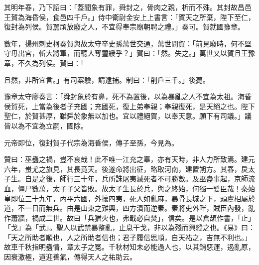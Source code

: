 \begin{pinyinscope}
其明年春，乃下詔曰：「蓋聞象有罪，舜封之，骨肉之親，析而不殊。其封故昌邑王賀為海昏侯，食邑四千戶。」侍中衛尉金安上上書言：「賀天之所棄，陛下至仁，復封為列侯。賀嚚頑放廢之人，不宜得奉宗廟朝聘之禮。」奏可。賀就國豫章。

數年，揚州刺史柯奏賀與故太守卒史孫萬世交通，萬世問賀：「前見廢時，何不堅守毋出宮，斬大將軍，而聽人奪璽綬乎？」賀曰：「然。失之。」萬世又以賀且王豫章，不久為列侯。賀曰：「

且然，非所宜言。」有司案驗，請逮捕。制曰：「削戶三千。」後薨。

豫章太守廖奏言：「舜封象於有鼻，死不為置後，以為暴亂之人不宜為太祖。海昏侯賀死，上當為後者子充國；充國死，復上弟奉親；奉親復死，是天絕之也。陛下聖仁，於賀甚厚，雖舜於象無以加也。宜以禮絕賀，以奉天意。願下有司議。」議皆以為不宜為立嗣，國除。

元帝即位，復封賀子代宗為海昏侯，傳子至孫，今見為。

贊曰：巫蠱之禍，豈不哀哉！此不唯一江充之辜，亦有天時，非人力所致焉。建元六年，蚩尤之旗見，其長竟天。後遂命將出征，略取河南，建置朔方。其春，戾太子生。自是之後，師行三十年，兵所誅屠夷滅死者不可勝數。及巫蠱事起，京師流血，僵尸數萬，太子子父皆敗。故太子生長於兵，與之終始，何獨一嬖臣哉！秦始皇即位三十九年，內平六國，外攘四夷，死人如亂麻，暴骨長城之下，頭盧相屬於道，不一日而無兵。由是山東之難興，四方潰而逆秦。秦將吏外畔，賊臣內發，亂作蕭牆，禍成二世。故曰「兵猶火也，弗戢必自焚」，信矣。是以倉頡作書，「止」「戈」為「武」。聖人以武禁暴整亂，止息干戈，非以為殘而興縱之也。《易》曰：「天之所助者順也，人之所助者信也；君子履信思順，自天祐之，吉無不利也。」故車千秋指明蠱情，章太子之冤。千秋材知未必能過人也，以其銷惡運，遏亂原，因衰激極，道迎善氣，傳得天人之祐助云。


\end{pinyinscope}